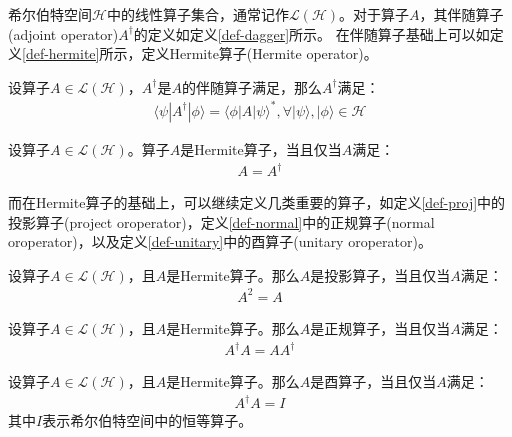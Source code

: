 希尔伯特空间\(\mathcal{H}\)中的线性算子集合，通常记作\(\mathcal{L} (\mathcal{H})\)。对于算子$A$，其伴随算子(adjoint operator)$A^\dagger$的定义如定义\ref{def-dagger}所示。
在伴随算子基础上可以如定义\ref{def-hermite}所示，定义Hermite算子(Hermite operator)。
\begin{definition}\citep{nielsen2010quantum}
    \label{def-dagger}
    设算子\(A \in \mathcal{L}(\mathcal{H})\)，\(A^\dagger\)是$A$的伴随算子满足，那么\(A^\dagger\)满足：
\begin{align}
    \langle \psi |A^\dagger|\phi \rangle = \langle \phi |A|\psi \rangle^*, \forall |\psi \rangle, |\phi \rangle\in \mathcal{H}
\end{align}
\end{definition}
\begin{definition}\citep{nielsen2010quantum}
    \label{def-hermite}
    设算子\(A \in \mathcal{L}(\mathcal{H})\)。算子\(A\)是Hermite算子，当且仅当\(A\)满足：
\begin{align}
    A = A^\dagger
\end{align}
\end{definition}


而在Hermite算子的基础上，可以继续定义几类重要的算子，如定义\ref{def-proj}中的投影算子(project oroperator)，定义\ref{def-normal}中的正规算子(normal oroperator)，以及定义\ref{def-unitary}中的酉算子(unitary oroperator)。
\begin{definition}\citep{nielsen2010quantum}
    \label{def-proj}
    设算子\(A \in \mathcal{L}(\mathcal{H})\)，且\(A\)是Hermite算子。那么\(A\)是投影算子，当且仅当\(A\)满足：
\begin{align}
    A^2 = A
\end{align}
\end{definition}

\begin{definition}\citep{nielsen2010quantum}
    \label{def-normal}
    设算子\(A \in \mathcal{L}(\mathcal{H})\)，且\(A\)是Hermite算子。那么\(A\)是正规算子，当且仅当\(A\)满足：
\begin{align}
    A^\dagger A = A A^\dagger
\end{align}
\end{definition}

\begin{definition}\citep{nielsen2010quantum}
    \label{def-unitary}
    设算子\(A \in \mathcal{L}(\mathcal{H})\)，且\(A\)是Hermite算子。那么\(A\)是酉算子，当且仅当\(A\)满足：
\begin{align}
    A^\dagger A = I
\end{align}
其中$I$表示希尔伯特空间中的恒等算子。
\end{definition}

